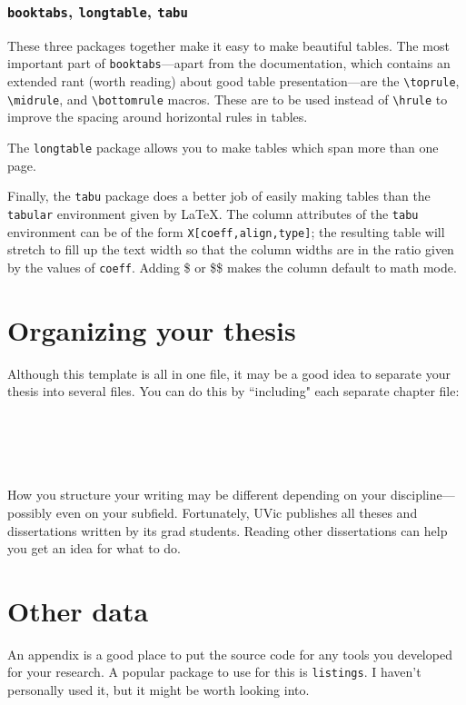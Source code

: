 \documentclass[12pt,oneside]{uvicthesis}
\begin{document}
\subsection{\texttt{booktabs}, \texttt{longtable}, \texttt{tabu}}
	These three packages together make it easy to make beautiful tables. The most important part of \texttt{booktabs}---apart from the documentation, which contains an extended rant (worth reading) about good table presentation---are the \texttt{\textbackslash toprule}, \texttt{\textbackslash midrule}, and \texttt{\textbackslash bottomrule} macros. These are to be used instead of \texttt{\textbackslash hrule} to improve the spacing around horizontal rules in tables.
	
	The \texttt{longtable} package allows you to make tables which span more than one page.
	
	Finally, the \texttt{tabu} package does a better job of easily making tables than the \texttt{tabular} environment given by \LaTeX. The column attributes of the \texttt{tabu} environment can be of the form \texttt{X[coeff,align,type]}; the resulting table will stretch to fill up the text width so that the column widths are in the ratio given by the values of \texttt{coeff}. Adding \$ or \$\$ makes the column default to math mode.
	

	
\chapter{Organizing your thesis}
	Although this template is all in one file, it may be a good idea to separate your thesis into several files. You can do this by ``including" each separate chapter file:
	\begin{verbatim}
	
	
	
	
	\end{verbatim}
How you structure your writing may be different depending on your discipline---possibly even on your subfield. Fortunately, UVic publishes all theses and dissertations written by its grad students. Reading other dissertations can help you get an idea for what to do.

\appendix
\chapter{Other data}
	An appendix is a good place to put the source code for any tools you developed for your research. A popular package to use for this is \texttt{listings}. I haven't personally used it, but it might be worth looking into.

\backmatter
	
	
\end{document}
